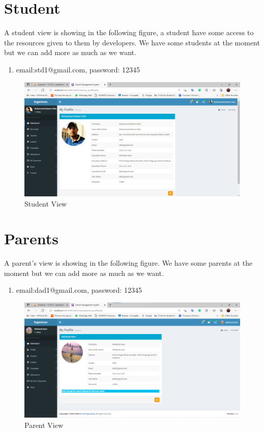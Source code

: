 \section{Student}
A student view is showing in the following figure, a student have some access to the resources given to them by developers.
We have some students at the moment but we can add more as much as we want.
\begin{enumerate}
\item email:std1@gmail.com, password: 12345
\end{enumerate}
\begin{figure}[H]  %
\begin{center}
\includegraphics[scale=0.43]{Chapter4/student}
\caption{Student View}
\label{student}
\end{center}
\end{figure}
\section{Parents}
A parent's view is showing in the following figure.
We have some parents at the moment but we can add more as much as we want.
\begin{enumerate}
\item email:dad1@gmail.com, password: 12345
\end{enumerate}
\begin{figure}[H]  %
\begin{center}
\includegraphics[scale=0.42]{Chapter4/parent}
\caption{Parent View}
\label{parent}
\end{center}
\end{figure}
